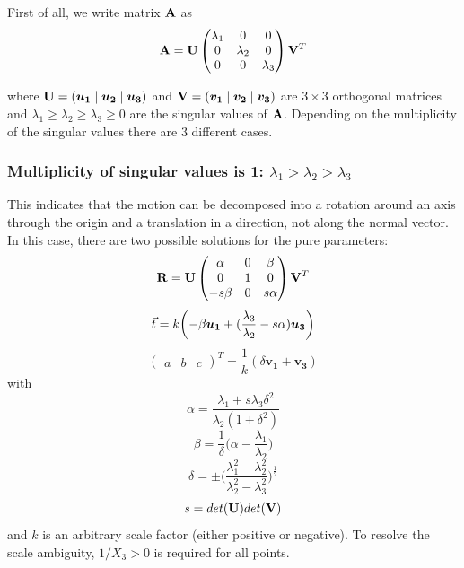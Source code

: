 First of all, we write matrix $\mathbf{A}$ as 
\begin{equation}
    \mathbf{A} = \mathbf{U}
    \begin{pmatrix}
        \lambda_1 & 0 & 0 \\
        0 & \lambda_2 & 0 \\
        0 & 0 & \lambda_3
    \end{pmatrix}\mathbf{V}^T
\end{equation}

where $\mathbf{U} = (\boldsymbol{u_1}\mid\boldsymbol{u_2}\mid\boldsymbol{u_3})$ and $\mathbf{V} = (\boldsymbol{v_1}\mid\boldsymbol{v_2}\mid\boldsymbol{v_3})$ are $3\times 3$ orthogonal matrices and $\lambda_1\geq\lambda_2\geq\lambda_3\geq 0$ are the singular values of $\mathbf{A}$. Depending on the multiplicity of the singular values there are 3 different cases.

\subsubsection{Multiplicity of singular values is 1: $\lambda_1 > \lambda_2 > \lambda_3$}

This indicates that the motion can be decomposed into a rotation around an axis through the origin and a translation in a direction, not along the normal vector. In this case, there are two possible solutions for the pure parameters:
\begin{equation*}
    \mathbf{R} = \mathbf{U}
    \begin{pmatrix}
        \alpha & 0 & \beta \\
        0 & 1 & 0 \\
        -s\beta & 0 & s\alpha
    \end{pmatrix}
    \mathbf{V}^T
\end{equation*}
\begin{equation*}
    \vec t = k\biggl(-\beta\boldsymbol{u_1} + (\frac{\lambda_3}{\lambda_2}-s\alpha)\boldsymbol{u_3}\biggr)
\end{equation*}
\begin{equation*}
    \begin{pmatrix}
        a & b & c
    \end{pmatrix}^T = \frac{1}{k}(\delta\boldsymbol{v_1} + \boldsymbol{v_3})
\end{equation*}
with
\begin{equation*}
    \alpha = \frac{\lambda_1 + s\lambda_3\delta^2}{\lambda_2(1+\delta^2)}
\end{equation*}
\begin{equation*}
    \beta = \frac{1}{\delta}\biggl(\alpha-\frac{\lambda_1}{\lambda_2}\biggr)
\end{equation*}
\begin{equation*}
    \delta = \pm\biggl(\frac{\lambda_1^2-\lambda_2^2}{\lambda_2^2-\lambda_3^2}\biggr)^\frac{1}{2}
\end{equation*}
\begin{equation*}
    s = det(\mathbf{U}) det(\mathbf{V})
\end{equation*}
and $k$ is an arbitrary scale factor (either positive or negative). To resolve the scale ambiguity, $1/X_3 > 0$ is required for all points.

